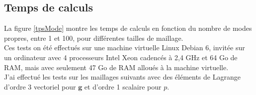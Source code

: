 

\subsection{Temps de calculs}
La figure \ref{tpsMode} montre les temps de calculs en fonction du nombre de modes propres, entre 1 et 100, pour différentes tailles de maillage.\\
Ces tests on été effectués sur une machine virtuelle Linux Debian 6, invitée sur un ordinateur avec 4 processeurs Intel Xeon cadencés à 2,4 GHz et 64 Go de RAM, mais avec seulement 47 Go de RAM alloués à la machine virtuelle.\\
J'ai effectué les tests sur les maillages suivants avec des éléments de Lagrange d'ordre 3 vectoriel pour $\bm{g}$ et d'ordre 1 scalaire pour $p$. \\

